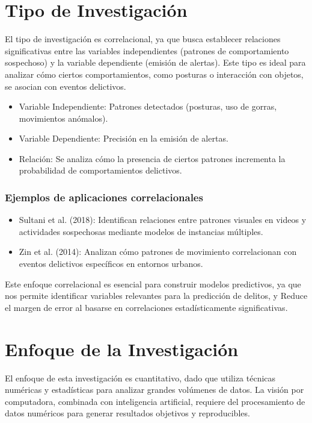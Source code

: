 \documentclass[listof=nochaptergap,12pt,times,authoryear]{report}
\begin{document}
\section{Tipo de Investigación}
El tipo de investigación es correlacional, ya que busca establecer relaciones significativas entre las variables independientes (patrones de comportamiento sospechoso) y la variable dependiente (emisión de alertas). Este tipo es ideal para analizar cómo ciertos comportamientos, como posturas o interacción con objetos, se asocian con eventos delictivos.

\begin{itemize}
    \item Variable Independiente: Patrones detectados (posturas, uso de gorras, movimientos anómalos).
    \item Variable Dependiente: Precisión en la emisión de alertas.
    \item Relación: Se analiza cómo la presencia de ciertos patrones incrementa la probabilidad de comportamientos delictivos.
\end{itemize}

\subsubsection{Ejemplos de aplicaciones correlacionales}
\begin{itemize}
    \item Sultani et al. (2018): Identifican relaciones entre patrones visuales en videos y actividades sospechosas mediante modelos de instancias múltiples.
    \item Zin et al. (2014): Analizan cómo patrones de movimiento correlacionan con eventos delictivos específicos en entornos urbanos.
\end{itemize}

Este enfoque correlacional es esencial para construir modelos predictivos, ya que nos permite identificar variables relevantes para la predicción de delitos, y Reduce el margen de error al basarse en correlaciones estadísticamente significativas.

\section{Enfoque de la Investigación}
El enfoque de esta investigación es cuantitativo, dado que utiliza técnicas numéricas y estadísticas para analizar grandes volúmenes de datos. La visión por computadora, combinada con inteligencia artificial, requiere del procesamiento de datos numéricos para generar resultados objetivos y reproducibles.
\end{document}
